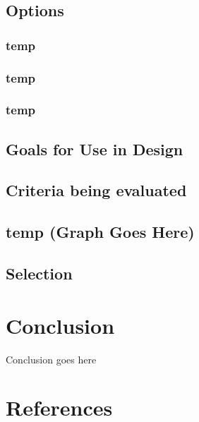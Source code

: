 \documentclass[10pt,letterpaper,onecolumn,journal]{IEEEtran}
\begin{document}
\subsection{Options}
\subsubsection{temp}

\subsubsection{temp}

\subsubsection{temp}

\subsection{Goals for Use in Design}

\subsection{Criteria being evaluated}

\subsection*{temp (Graph Goes Here)}

\subsection{Selection}

\section{Conclusion}

Conclusion goes here

\section{References}



\end{document}
